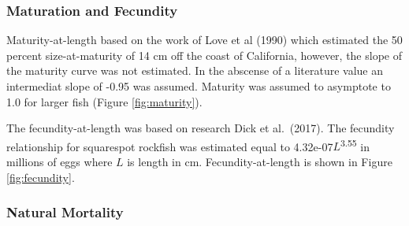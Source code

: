 \documentclass[11pt,
  english,
  a4paper,
]{article}
\begin{document}
\leavevmode\tagmcend\tagstructend\par


\hypertarget{maturation-and-fecundity}{%
\subsubsection{Maturation and Fecundity}\label{maturation-and-fecundity}}

\leavevmode\tagmcend\tagstructend


Maturity-at-length based on the work of Love et al {(1990)\leavevmode\tagmcend\tagstructend} which estimated the 50 percent size-at-maturity of 14 cm off the coast of California, however, the slope of the maturity curve was not estimated. In the abscense of a literature value an intermediat slope of -0.95 was assumed. Maturity was assumed to asymptote to 1.0 for larger fish (Figure \ref{fig:maturity}).

\leavevmode\tagmcend\tagstructend\par


The fecundity-at-length was based on research Dick et al.~{(2017)\leavevmode\tagmcend\tagstructend}. The fecundity relationship for squarespot rockfish was estimated equal to 4.32e-07{\(L\)\leavevmode\tagmcend\tagstructend}\textsuperscript{3.55} in millions of eggs where {\(L\)\leavevmode\tagmcend\tagstructend} is length in cm. Fecundity-at-length is shown in Figure \ref{fig:fecundity}.

\leavevmode\tagmcend\tagstructend\par


\hypertarget{natural-mortality}{%
\subsubsection{Natural Mortality}\label{natural-mortality}}

\leavevmode\tagmcend\tagstructend

\end{document}
